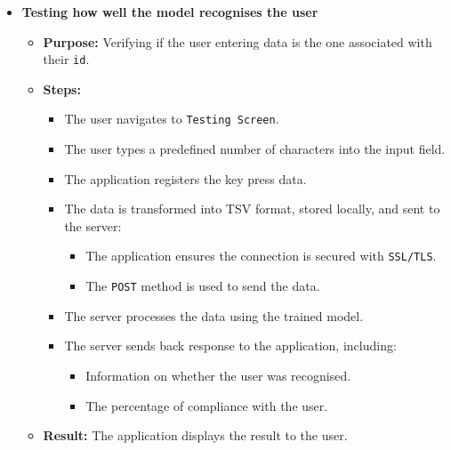 \begin{itemize}
	\item \textbf{Testing how well the model recognises the user}
	\begin{itemize}
		\item \textbf{Purpose:} Verifying if the user entering data is the one associated with their \texttt{id}.
		\item \textbf{Steps:}
		\begin{itemize}
			\item The user navigates to \texttt{Testing Screen}.
			\item The user types a predefined number of characters into the input field.
			\item The application registers the key press data.
			\item The data is transformed into TSV format, stored locally, and sent to the server:
			\begin{itemize}
				\item The application ensures the connection is secured with \texttt{SSL/TLS}.
				\item The \texttt{POST} method is used to send the data.
			\end{itemize}
			\item The server processes the data using the trained model.
			\item The server sends back response to the application, including:
			\begin{itemize}
				\item Information on whether the user was recognised.
				\item The percentage of compliance with the user.
			\end{itemize}
		\end{itemize}
		\item \textbf{Result:} The application displays the result to the user.
	\end{itemize}
	
\end{itemize}